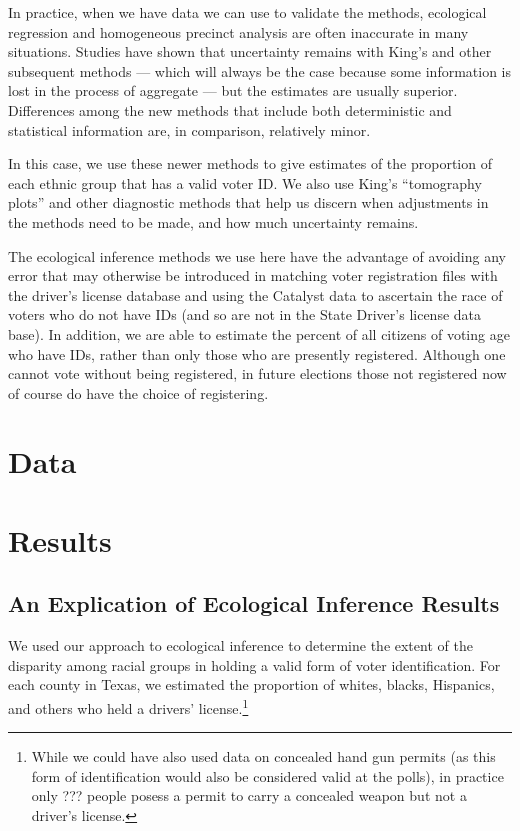 \documentclass[12pt]{article}
\begin{document}
In practice, when we have data we can use to validate the methods,
ecological regression and homogeneous precinct analysis are often
inaccurate in many situations. Studies have shown that uncertainty
remains with King's and other subsequent methods --- which will always
be the case because some information is lost in the process of
aggregate --- but the estimates are usually superior. Differences
among the new methods that include both deterministic and statistical
information are, in comparison, relatively minor.

In this case, we use these newer methods to give estimates of the
proportion of each ethnic group that has a valid voter ID.  We also
use King's ``tomography plots'' and other diagnostic methods that help
us discern when adjustments in the methods need to be made, and how
much uncertainty remains.

The ecological inference methods we use here have the advantage of
avoiding any error that may otherwise be introduced in matching voter
registration files with the driver's license database and using the
Catalyst data to ascertain the race of voters who do not have IDs (and
so are not in the State Driver's license data base).  In addition, we
are able to estimate the percent of all citizens of voting age who
have IDs, rather than only those who are presently registered.
Although one cannot vote without being registered, in future elections
those not registered now of course do have the choice of registering.

\section{Data}\label{s:data}

\section{Results}\label{s:res}

\subsection{An Explication of Ecological Inference Results}

We used our approach to ecological inference to determine the extent
of the disparity among racial groups in holding a valid form of voter identification. For each
county in Texas, we estimated the proportion of whites, blacks, Hispanics,
and others who held a drivers' license.\footnote{While we could have also used data on concealed hand gun permits
(as this form of identification would also be considered valid at the polls), in practice only ??? people posess a permit to carry a concealed weapon but not a driver's license.} 
\end{document}

